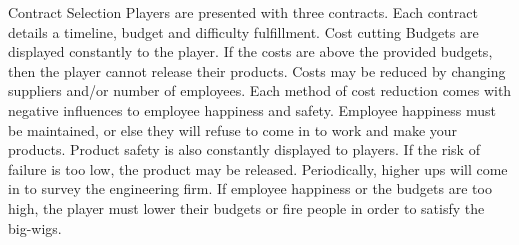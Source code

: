 \documentclass[archE1,portrait]{baposter}
\begin{document}
\begin{poster}
{}


{ 
	\begin{outline}
		\1 Contract Selection
			\2 Players are presented with three contracts. Each contract details a timeline, budget and difficulty fulfillment.
		\1 Cost cutting
			\2 Budgets are displayed constantly to the player. If the costs are above the provided budgets, then the player cannot release their products.
			\2 Costs may be reduced by changing suppliers and/or number of employees.
			\2 Each method of cost reduction comes with negative influences to employee happiness and safety.
		\1 Employee happiness must be maintained, or else they will refuse to come in to work and make your products.
		\1 Product safety is also constantly displayed to players. If the risk of failure is too low, the product may be released.
		\1 Periodically, higher ups will come in to survey the engineering firm. If employee happiness or the budgets are too high, the player must lower their budgets or fire people in order to satisfy the big-wigs.
	\end{outline}
}
\end{poster}
\newpage
\end{document}
